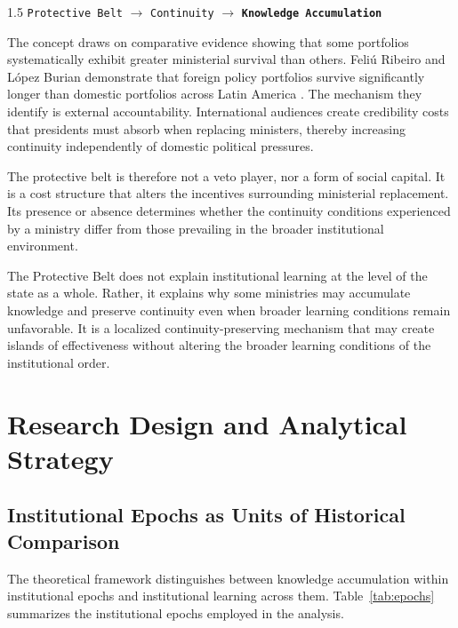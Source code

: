 \documentclass[doc, 12pt, a4paper,floatsintext]{apa7}
\begin{document}
\begin{spacing}{1.5}
\noindent
\texttt{Protective Belt}
$\rightarrow$
\texttt{Continuity}
$\rightarrow$
\texttt{\bf Knowledge Accumulation}
\end{spacing}

The concept draws on comparative evidence showing that some portfolios systematically exhibit greater ministerial survival than others. Feliú Ribeiro and López Burian demonstrate that foreign policy portfolios survive significantly longer than domestic portfolios across Latin America \parencite{feliu_ribeiro_foreign_2023}. The mechanism they identify is external accountability. International audiences create credibility costs that presidents must absorb when replacing ministers, thereby increasing continuity independently of domestic political pressures.

The protective belt is therefore not a veto player, nor a form of social capital. It is a cost structure that alters the incentives surrounding ministerial replacement. Its presence or absence determines whether the continuity conditions experienced by a ministry differ from those prevailing in the broader institutional environment.

The Protective Belt does not explain institutional learning at the level of the state as a whole. Rather, it explains why some ministries may accumulate knowledge and preserve continuity even when broader learning conditions remain unfavorable. It is a localized continuity-preserving mechanism that may create islands of effectiveness without altering the broader learning conditions of the institutional order.
\newpage
\section{Research Design and Analytical Strategy}

\subsection{Institutional Epochs as Units of Historical Comparison}

The theoretical framework distinguishes between knowledge accumulation within institutional epochs and institutional learning across them. Table~\ref{tab:epochs} summarizes the institutional epochs employed in the analysis.
\end{document}
